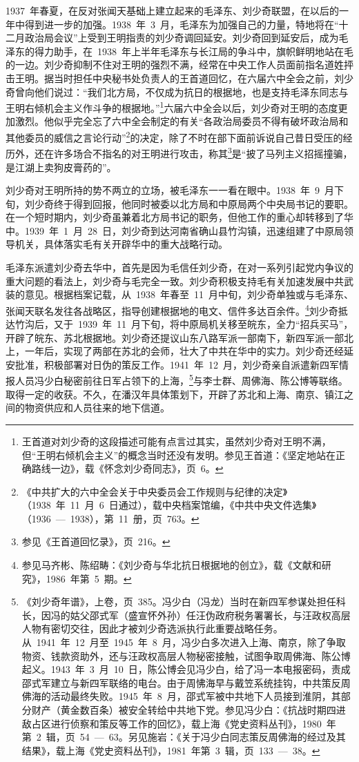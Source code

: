 1937~年春夏，在反对张闻天基础上建立起来的毛泽东、刘少奇联盟，在以后的一年中得到进一步的加强。1938~年~3~月，毛泽东为加强自己的力量，特地将在“十二月政治局会议”上受到王明指责的刘少奇调回延安。刘少奇回到延安后，成为毛泽东的得力助手，在~1938~年上半年毛泽东与长江局的争斗中，旗帜鲜明地站在毛的一边。刘少奇抑制不住对王明的强烈不满，经常在中央工作人员面前指名道姓抨击王明。据当时担任中央秘书处负责人的王首道回忆，在六届六中全会之前，刘少奇曾向他们说过：“我们北方局，不仅成为抗日的根据地，也是支持毛泽东同志与王明右倾机会主义作斗争的根据地。”\footnote{王首道对刘少奇的这段描述可能有点言过其实，虽然刘少奇对王明不满，但“王明右倾机会主义”的概念当时还没有发明。参见王首道：《坚定地站在正确路线一边》，载《怀念刘少奇同志》，页~6。}六届六中全会以后，刘少奇对王明的态度更加激烈。他似乎完全忘了六中全会制定的有关“各政治局委员不得有破坏政治局和其他委员的威信之言论行动”\footnote{《中共扩大的六中全会关于中央委员会工作规则与纪律的决定》（1938~年~11~月~6~日通过），载中央档案馆编，《中共中央文件选集》（1936~—~1938），第~11~册，页~763。}的决定，除了不时在部下面前诉说自己昔日受压的经历外，还在许多场合不指名的对王明进行攻击，称其\footnote{参见《王首道回忆录》，页~216。}是“披了马列主义招摇撞骗，是江湖上卖狗皮膏药的”。

刘少奇对王明所持的势不两立的立场，被毛泽东一一看在眼中。1938~年~9~月下旬，刘少奇终于得到回报，他同时被委以北方局和中原局两个中央局书记的要职。在一个短时期内，刘少奇虽兼着北方局书记的职务，但他工作的重心却转移到了华中。1939~年~1~月~28~日，刘少奇到达河南省确山县竹沟镇，迅速组建了中原局领导机关，具体落实毛有关开辟华中的重大战略行动。

毛泽东派遣刘少奇去华中，首先是因为毛信任刘少奇，在对一系列引起党内争议的重大问题的看法上，刘少奇与毛完全一致。刘少奇积极支持毛有关加速发展中共武装的意见。根据档案记载，从~1938~年春至~11~月中旬，刘少奇单独或与毛泽东、张闻天联名发往各战略区，指导创建根据地的电文、信件多达百余件。\footnote{参见马齐彬、陈绍畴：《刘少奇与华北抗日根据地的创立》，载《文献和研究》，1986~年第~5~期。}刘少奇抵达竹沟后，又于~1939~年~11~月下旬，将中原局机关移至皖东，全力“招兵买马”，开辟了皖东、苏北根据地。刘少奇还提议山东八路军派一部南下，新四军派一部北上，一年后，实现了两部在苏北的会师，壮大了中共在华中的实力。刘少奇还经延安批准，积极部署对日伪的策反工作。1941~年~12~月，刘少奇亲自派遣新四军情报人员冯少白秘密前往日军占领下的上海，\footnote{《刘少奇年谱》，上卷，页~385。冯少白（冯龙）当时在新四军参谋处担任科长，因冯的姑父邵式军（盛宣怀外孙）任汪伪政府税务署署长，与汪政权高层人物有密切交往，因此才被刘少奇选派执行此重要战略任务。从~1941~年~12~月至~1945~年~8~月，冯少白多次进入上海、南京，除了争取物资、钱款资助外，还与汪政权高层人物秘密接触，试图争取周佛海、陈公博起义。1943~年~3~月~10~日，陈公博会见冯少白，给了冯一本电报密码，责成邵式军建立与新四军联络的电台。由于周怫海早与戴笠系统挂钩，中共策反周佛海的活动最终失败。1945~年~8~月，邵式军被中共地下人员接到淮阴，其部分财产（黄金数百条）被安全转给中共地下党。参见冯少白：《抗战时期四进敌占区进行侦察和策反等工作的回忆》，载上海《党史资料丛刊》，1980~年第~2~辑，页~54~—~63。另见施岩：《关于冯少白同志策反周佛海的经过及其结果》，载上海《党史资料丛刊》，1981~年第~3~辑，页~133~—~38。}与李士群、周佛海、陈公博等联络。取得一定的收获。不久，在潘汉年具体策划下，开辟了苏北和上海、南京、镇江之间的物资供应和人员往来的地下信道。

